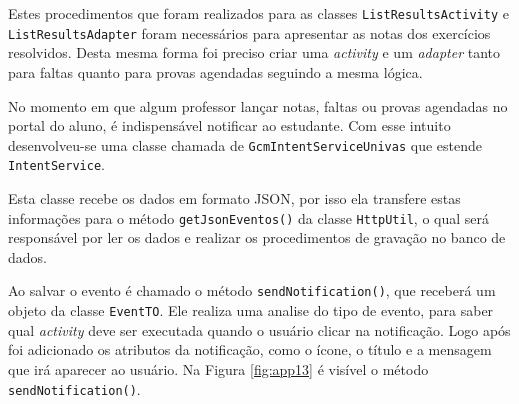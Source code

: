 	\par Estes procedimentos que foram realizados para as classes
\texttt{ListResultsActivity} e \texttt{ListResultsAdapter} foram necessários
para apresentar as notas dos exercícios resolvidos. Desta mesma forma foi
preciso criar uma \textit{activity} e um \textit{adapter} tanto para faltas
quanto para provas agendadas seguindo a mesma lógica.

	\par No momento em que algum professor lançar notas, faltas ou provas agendadas
no portal do aluno, é indispensável notificar ao estudante. Com esse intuito
desenvolveu-se uma classe chamada de \texttt{GcmIntentServiceUnivas} que
estende \texttt{IntentService}.

	\par Esta classe recebe os dados em formato JSON, por isso ela transfere estas
informações para o método \texttt{getJsonEventos()} da classe
\texttt{HttpUtil}, o qual será responsável por ler os dados e realizar os
procedimentos de gravação no banco de dados.

	\par Ao salvar o evento é chamado o método \texttt{sendNotification()}, que
receberá um objeto da classe \texttt{EventTO}. Ele realiza uma analise do tipo
de evento, para saber qual \textit{activity} deve ser executada quando o
usuário clicar na notificação. Logo após foi adicionado os atributos da
notificação, como o ícone, o título e a mensagem que irá aparecer ao usuário.
Na Figura \ref{fig:app13} é visível o método \texttt{sendNotification()}.


